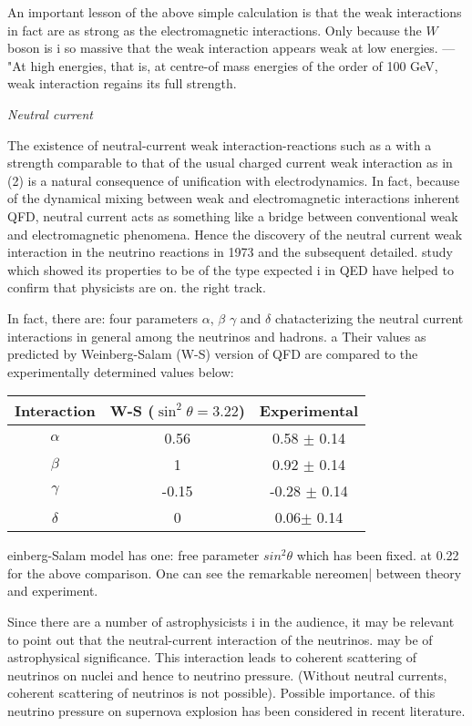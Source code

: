 An important lesson of the above simple calculation is that the weak
interactions in fact are as strong as the electromagnetic interactions. Only
because the $W$ boson is i so massive that the weak interaction appears weak
at low energies. — "At high energies, that is, at centre-of mass energies of
the order of 100 GeV, weak interaction regains its full strength.

{\it Neutral current}

The existence of neutral-current weak interaction-reactions such as a
with a strength comparable to that of the usual charged current weak
interaction as in (2) is a natural consequence of unification with electrodynamics. In fact, because of the dynamical mixing between weak and electromagnetic interactions inherent QFD, neutral current acts as something  like a bridge between conventional weak and electromagnetic phenomena.
Hence the discovery of the neutral current weak interaction in the neutrino
reactions in 1973 and the subsequent detailed. study which showed its
properties to be of the type expected i in QED have helped to confirm that
physicists are on. the right track. 

In fact, there are: four parameters $\alpha$, $\beta$ $\gamma$ and $\delta$ chatacterizing the
neutral current interactions in general among the neutrinos and hadrons.
a Their values as predicted by Weinberg-Salam (W-S) version of QFD are  compared to the experimentally determined values below: 

\begin{center}
\begin{tabular}	{ccc}
\hline 
Interaction& W-S ($\sin^{2} \theta = 3.22$) & Experimental\\
\hline
$\alpha$ & 0.56 & 0.58 $\pm$ 0.14\\
$\beta$ & 1 &  0.92 $\pm$ 0.14\\
$\gamma$ & -0.15 & -0.28 $\pm$ 0.14\\
$\delta$ & 0 & 0.06$\pm$ 0.14\\
\hline
\end{tabular}
\end{center}

einberg-Salam model has one: free parameter $sin^{2} \theta$ which has been fixed.
at 0.22 for the above comparison. One can see the remarkable nereomen|
between theory and experiment.

Since there are a number of astrophysicists i in the audience, it may be
relevant to point out that the neutral-current interaction of the neutrinos.
may be of astrophysical significance. This interaction leads to coherent
 scattering of neutrinos on nuclei and hence to neutrino pressure. (Without neutral currents, coherent scattering of neutrinos is not possible).
Possible importance. of this neutrino pressure on supernova explosion has been considered in recent literature.  

